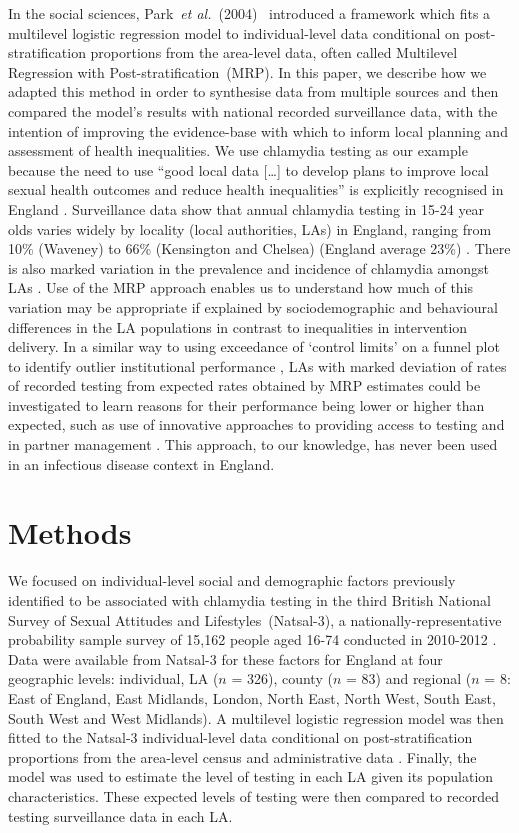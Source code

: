 \documentclass[fleqn,10pt]{wlscirep}
\begin{document}
In the social sciences, Park~{\it et al.}~(2004)~\cite{Park2004} introduced a framework which fits a multilevel logistic regression model to individual-level data conditional on post-stratification proportions from the area-level data, often called Multilevel Regression with Post-stratification~(MRP). In this paper, we describe how we adapted this method \cite{Park2004} in order to synthesise data from multiple sources and then compared the model’s results with national recorded surveillance data, with the intention of improving the evidence-base with which to inform local planning and assessment of health inequalities. We use chlamydia testing as our example because the need to use “good local data […] to develop plans to improve local sexual health outcomes and reduce health inequalities” is explicitly recognised in England \cite{DepartmentofHealth2013}. Surveillance data show that annual chlamydia testing in 15-24 year olds varies widely by locality (local authorities, LAs) in England, ranging from 10\% (Waveney) to 66\% (Kensington and Chelsea) (England average 23\%) \cite{fingertips}. There is also marked variation in the prevalence and incidence of chlamydia amongst LAs \cite{Lewis2017}. Use of the MRP approach enables us to understand how much of this variation may be appropriate if explained by sociodemographic and behavioural differences in the LA populations in contrast to inequalities in intervention delivery. In a similar way to using exceedance of ‘control limits’ on a funnel plot to identify outlier institutional performance \cite{Spiegelhalter2005}, LAs with marked deviation of rates of recorded testing from expected rates obtained by MRP estimates could be investigated to learn reasons for their performance being lower or higher than expected, such as use of innovative approaches to providing access to testing \cite{Estcourt2016} and in partner management \cite{Althaus2014}. This approach, to our knowledge, has never been used in an infectious disease context in England.

\section*{Methods}

We focused on individual-level social and demographic factors previously identified to be associated with chlamydia testing in the third British National Survey of Sexual Attitudes and Lifestyles~(Natsal-3), a nationally-representative probability sample survey of 15,162 people aged 16-74 conducted in 2010-2012 \cite{Erens2014,Johnson2017}. Data were available from Natsal-3 for these factors for England at four geographic levels: individual, LA ($n$ = 326), county ($n$ = 83) and regional ($n$ = 8: East of England, East Midlands, London, North East, North West, South East, South West and West Midlands). A multilevel logistic regression model was then fitted to the Natsal-3 individual-level data conditional on post-stratification proportions from the area-level census and administrative data \cite{Park2004}. Finally, the model was used to estimate the level of testing in each LA given its population characteristics. These expected levels of testing were then compared to recorded testing surveillance data in each LA.
\end{document}
